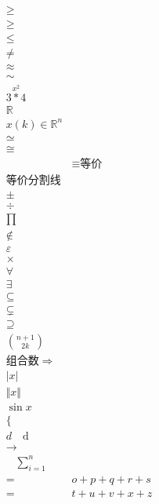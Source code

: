 \documentclass{article}
\begin{document}
    \[
    \begin{aligned}  %
        \geq \\ %
        \geqslant \\ %
        \leq \\ %
        \neq \\ %
        \approx \\ %
        \sim \\ %
        \stackrel{x^2}{3*4} \\ %
        \mathbb{R} \\ %
        x(k) \in \mathbb{R}^n  \\
        \simeq \\ 
        \cong \\ %
        &\equiv \text{等价} \\ 等价
        \text{分割线} \\
        \pm \\ %
        \div \\ %
        \prod \\ %
        \notin \\ %
        \varepsilon \\
        \times \\ %
        \forall \\ %
        \exists \\ %
        \subseteq \\ %
        \subsetneq \\
        \supseteq \\
        \binom{n+1}{2k} \\ 组合数
        \Rightarrow \\ 
        \vert x \vert \\ %
        \Vert x \Vert \\ %
        \sin x \\ %
        \{  \\  %
        d \quad \mathrm{d} \\ %
        \rightarrow \\ %
        \quad %
        \sum\limits_{i=1}^{n} \\ %
        =& o+p+q+r+s \\ 
        =& t+u+v+x+z 
        \end{aligned}
        \]
\end{document}
